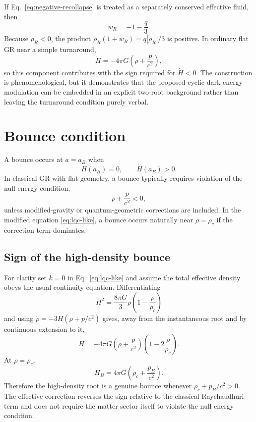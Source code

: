 \documentclass[11pt]{article}
\theoremstyle{remark}
\begin{document}
If Eq.~\eqref{eq:negative-recollapse} is treated as a separately conserved effective fluid, then
\begin{equation}
 w_R=-1-\frac{q}{3}.
\end{equation}
Because $\rho_R<0$, the product $\rho_R(1+w_R)=q|\rho_R|/3$ is positive. In ordinary flat GR near a simple turnaround,
\begin{equation}
 \dot H=-4\pi G\left(\rho+\frac{p}{c^2}\right),
\end{equation}
so this component contributes with the sign required for $\dot H<0$. The construction is phenomenological, but it demonstrates that the proposed cyclic dark-energy modulation can be embedded in an explicit two-root background rather than leaving the turnaround condition purely verbal.


\section{Bounce condition}
A bounce occurs at $a=a_B$ when
\begin{equation}
    H(a_B)=0,
    \qquad
    \dot H(a_B)>0.
\end{equation}
In classical GR with flat geometry, a bounce typically requires violation of the null energy condition,
\begin{equation}
    \rho+\frac{p}{c^2}<0,
\end{equation}
unless modified-gravity or quantum-geometric corrections are included. In the modified equation \eqref{eq:lqc-like}, a bounce occurs naturally near $\rho=\rho_c$ if the correction term dominates.


\subsection{Sign of the high-density bounce}
For clarity set $k=0$ in Eq.~\eqref{eq:lqc-like} and assume the total effective density obeys the usual continuity equation. Differentiating
\begin{equation}
 H^2=\frac{8\pi G}{3}\rho\left(1-\frac{\rho}{\rho_c}\right)
\end{equation}
and using $\dot\rho=-3H(\rho+p/c^2)$ gives, away from the instantaneous root and by continuous extension to it,
\begin{equation}
 \dot H
 =-4\pi G\left(\rho+\frac{p}{c^2}\right)
 \left(1-2\frac{\rho}{\rho_c}\right).
 \label{eq:lqc-hdot}
\end{equation}
At $\rho=\rho_c$,
\begin{equation}
 \dot H_B
 =4\pi G\left(\rho_c+\frac{p_B}{c^2}\right).
 \label{eq:bounce-sign}
\end{equation}
Therefore the high-density root is a genuine bounce whenever $\rho_c+p_B/c^2>0$. The effective correction reverses the sign relative to the classical Raychaudhuri term and does not require the matter sector itself to violate the null energy condition.
\end{document}
